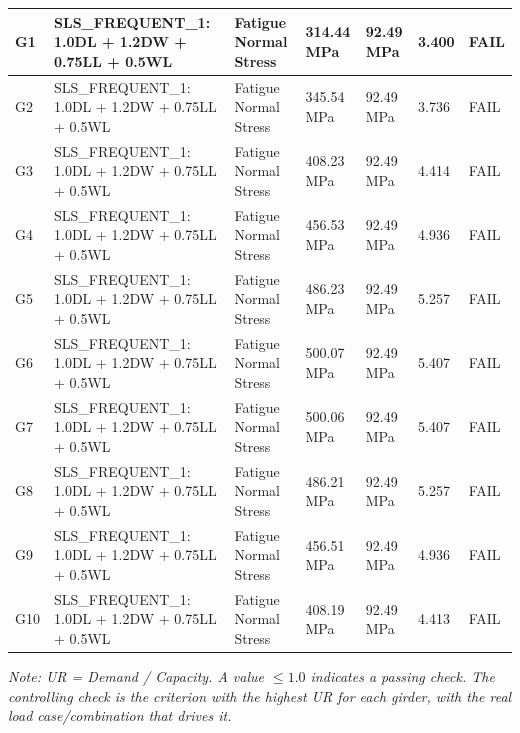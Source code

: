 \documentclass[12pt,a4paper]{report}
\numberwithin{table}{chapter}
\numberwithin{figure}{chapter}
\newcommand{\ReportTableRowGap}{6pt}
\begin{document}
\begin{longtable}{|C{1.6cm}|>{\centering\arraybackslash}p{3.6cm}|C{2.4cm}|C{2.0cm}|C{2.1cm}|C{1.7cm}|C{1.5cm}|}
G1 & SLS\_\allowbreak{}FREQUENT\_\allowbreak{}1:\allowbreak{} 1.0DL + 1.2DW + 0.75LL + 0.5WL & Fatigue Normal Stress & 314.44 MPa & 92.49 MPa & 3.400 & \textcolor{reportRed}{FAIL} \\[\ReportTableRowGap]
\hline
G2 & SLS\_\allowbreak{}FREQUENT\_\allowbreak{}1:\allowbreak{} 1.0DL + 1.2DW + 0.75LL + 0.5WL & Fatigue Normal Stress & 345.54 MPa & 92.49 MPa & 3.736 & \textcolor{reportRed}{FAIL} \\[\ReportTableRowGap]
\hline
G3 & SLS\_\allowbreak{}FREQUENT\_\allowbreak{}1:\allowbreak{} 1.0DL + 1.2DW + 0.75LL + 0.5WL & Fatigue Normal Stress & 408.23 MPa & 92.49 MPa & 4.414 & \textcolor{reportRed}{FAIL} \\[\ReportTableRowGap]
\hline
G4 & SLS\_\allowbreak{}FREQUENT\_\allowbreak{}1:\allowbreak{} 1.0DL + 1.2DW + 0.75LL + 0.5WL & Fatigue Normal Stress & 456.53 MPa & 92.49 MPa & 4.936 & \textcolor{reportRed}{FAIL} \\[\ReportTableRowGap]
\hline
G5 & SLS\_\allowbreak{}FREQUENT\_\allowbreak{}1:\allowbreak{} 1.0DL + 1.2DW + 0.75LL + 0.5WL & Fatigue Normal Stress & 486.23 MPa & 92.49 MPa & 5.257 & \textcolor{reportRed}{FAIL} \\[\ReportTableRowGap]
\hline
G6 & SLS\_\allowbreak{}FREQUENT\_\allowbreak{}1:\allowbreak{} 1.0DL + 1.2DW + 0.75LL + 0.5WL & Fatigue Normal Stress & 500.07 MPa & 92.49 MPa & 5.407 & \textcolor{reportRed}{FAIL} \\[\ReportTableRowGap]
\hline
G7 & SLS\_\allowbreak{}FREQUENT\_\allowbreak{}1:\allowbreak{} 1.0DL + 1.2DW + 0.75LL + 0.5WL & Fatigue Normal Stress & 500.06 MPa & 92.49 MPa & 5.407 & \textcolor{reportRed}{FAIL} \\[\ReportTableRowGap]
\hline
G8 & SLS\_\allowbreak{}FREQUENT\_\allowbreak{}1:\allowbreak{} 1.0DL + 1.2DW + 0.75LL + 0.5WL & Fatigue Normal Stress & 486.21 MPa & 92.49 MPa & 5.257 & \textcolor{reportRed}{FAIL} \\[\ReportTableRowGap]
\hline
G9 & SLS\_\allowbreak{}FREQUENT\_\allowbreak{}1:\allowbreak{} 1.0DL + 1.2DW + 0.75LL + 0.5WL & Fatigue Normal Stress & 456.51 MPa & 92.49 MPa & 4.936 & \textcolor{reportRed}{FAIL} \\[\ReportTableRowGap]
\hline
G10 & SLS\_\allowbreak{}FREQUENT\_\allowbreak{}1:\allowbreak{} 1.0DL + 1.2DW + 0.75LL + 0.5WL & Fatigue Normal Stress & 408.19 MPa & 92.49 MPa & 4.413 & \textcolor{reportRed}{FAIL} \\[\ReportTableRowGap]
\hline
\end{longtable}
\noindent\textit{Note: UR = Demand / Capacity. A value $\leq 1.0$ indicates a passing check. The controlling check is the criterion with the highest UR for each girder, with the real load case/combination that drives it.}
\end{document}
